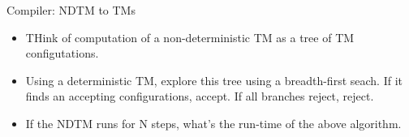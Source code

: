 Compiler: NDTM to TMs
\begin{itemize}
  \item THink of computation of a non-deterministic TM as a tree of TM configutations.
  \item Using a deterministic TM, explore this tree using a breadth-first seach. If it finds an accepting configurations, accept. If all branches reject, reject.
  \item If the NDTM runs for N steps, what's the run-time of the above algorithm.
\end{itemize}


